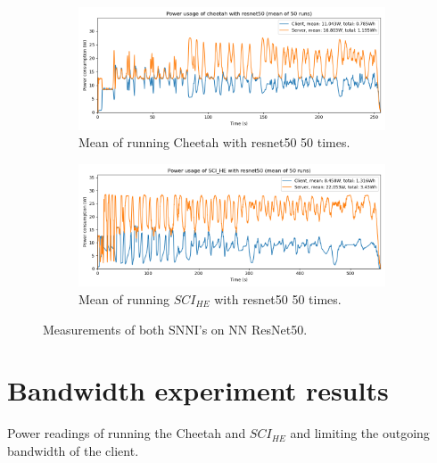 \documentclass[../thesis.tex]{subfiles}
\begin{document}
\begin{figure}[th!]
    \begin{subfigure}{.8\linewidth}
            \includegraphics[width=\textwidth]{Thesis/Images/Means/mean_cheetah-resnet50.png}
            \caption{Mean of running Cheetah with resnet50 50 times.}
            \label{fig:mean_cheetah_resnet50}
    \end{subfigure}
    \medskip
    \begin{subfigure}{.8\linewidth}
            \includegraphics[width=\textwidth]{Thesis/Images/Means/mean_SCI_HE-resnet50.png}
            \caption{Mean of running $SCI_{HE}$ with resnet50 50 times.}
            \label{fig:mean_SCI_HE_resnet50}
    \end{subfigure}

    \caption{Measurements of both SNNI's on NN ResNet50.}
\end{figure}

\section{Bandwidth experiment results}
\begin{table}[bh]
    \begin{adjustbox}{width=\columnwidth,center}
        
    \end{adjustbox}
    \caption{Power readings of running the Cheetah and $SCI_{HE}$ and limiting the outgoing bandwidth of the client.}
    \label{table:powerreadingsclient}
\end{table}
\end{document}
